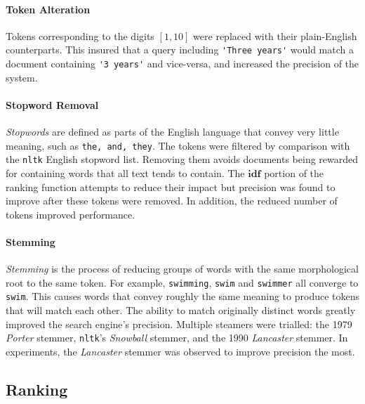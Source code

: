 \documentclass[10pt, a4paper, twocolumn]{article}   	%
\begin{document}
\paragraph{Token Alteration}
Tokens corresponding to the digits $[1, 10]$ were replaced with their plain-English counterparts. This insured that a query including \verb|'Three years'| would match a document containing \verb|'3 years'| and vice-versa, and increased the precision of the system.

\paragraph{Stopword Removal}
\emph{Stopwords} are defined as parts of the English language that convey very little meaning, such as \verb|the, and, they|.
The tokens were filtered by comparison with the \verb|nltk| English stopword list. Removing them avoids documents being rewarded for containing words that all text tends to contain. The $\mathbf{idf}$ portion of the ranking function attempts to reduce their impact but precision was found to improve after these tokens were removed. In addition, the reduced number of tokens improved performance.

\paragraph{Stemming}
\emph{Stemming} is the process of reducing groups of words with the same morphological root to the same token. For example, \verb|swimming|, \verb|swim| and \verb|swimmer| all converge to \verb|swim|. This causes words that convey roughly the same meaning to produce tokens that will match each other. The ability to match originally distinct words greatly improved the search engine's precision. Multiple steamers were trialled: the 1979 \emph{Porter} stemmer, \verb|nltk|'s \emph{Snowball} stemmer, and the 1990 \emph{Lancaster} stemmer. In experiments, the \emph{Lancaster} stemmer was observed to improve precision the most.

\subsection{Ranking}
\end{document}
